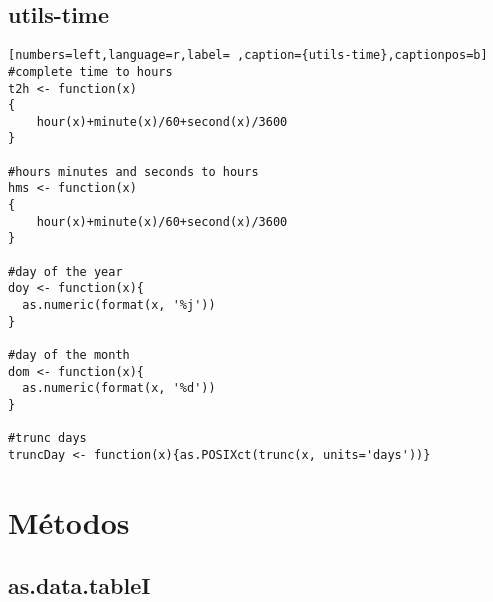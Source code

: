 \subsection{utils-time}
\label{sec:org4f248be}
\begin{lstlisting}[numbers=left,language=r,label= ,caption={utils-time},captionpos=b]
#complete time to hours
t2h <- function(x)
{
    hour(x)+minute(x)/60+second(x)/3600
}

#hours minutes and seconds to hours
hms <- function(x)
{
    hour(x)+minute(x)/60+second(x)/3600
}

#day of the year
doy <- function(x){
  as.numeric(format(x, '%j'))
}

#day of the month
dom <- function(x){
  as.numeric(format(x, '%d'))
}

#trunc days
truncDay <- function(x){as.POSIXct(trunc(x, units='days'))}
\end{lstlisting}
\section{Métodos}
\label{sec:org9f62ed7}
\subsection{as.data.tableI}
\label{sec:org5963a1c}

